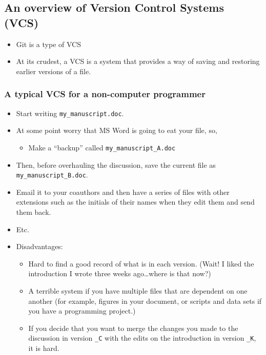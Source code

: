 \documentclass[]{book}
\providecommand{\tightlist}{%
  \setlength{\itemsep}{0pt}\setlength{\parskip}{0pt}}
\theoremstyle{definition}
\theoremstyle{definition}
\theoremstyle{remark}
\begin{document}
\subsection{An overview of Version Control Systems (VCS)}\label{vcs}

\begin{itemize}
\tightlist
\item
  Git is a type of VCS
\item
  At its crudest, a VCS is a system that provides a way of saving and
  restoring earlier versions of a file.
\end{itemize}

\subsubsection{A typical VCS for a non-computer
programmer}\label{a-typical-vcs-for-a-non-computer-programmer}

\begin{itemize}
\tightlist
\item
  Start writing \texttt{my\_manuscript.doc}.
\item
  At some point worry that MS Word is going to eat your file, so,

  \begin{itemize}
  \tightlist
  \item
    Make a ``backup'' called \texttt{my\_manuscript\_A.doc}
  \end{itemize}
\item
  Then, before overhauling the discussion, save the current file as
  \texttt{my\_manuscript\_B.doc}.
\item
  Email it to your coauthors and then have a series of files with other
  extensions such as the initials of their names when they edit them and
  send them back.
\item
  Etc.
\item
  Disadvantages:

  \begin{itemize}
  \tightlist
  \item
    Hard to find a good record of what is in each version. (Wait! I
    liked the introduction I wrote three weeks ago\ldots{}where is that
    now?)
  \item
    A terrible system if you have multiple files that are dependent on
    one another (for example, figures in your document, or scripts and
    data sets if you have a programming project.)
  \item
    If you decide that you want to merge the changes you made to the
    discussion in version \texttt{\_C} with the edits on the
    introduction in version \texttt{\_K}, it is hard.
  \end{itemize}
\end{itemize}
\end{document}
